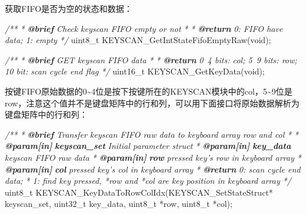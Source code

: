 \documentclass[
  12pt,
]{book}
\newenvironment{Shaded}{\begin{snugshade}}{\end{snugshade}}
\newcommand{\AnnotationTok}[1]{\textcolor[rgb]{0.56,0.35,0.01}{\textbf{\textit{#1}}}}
\newcommand{\CommentTok}[1]{\textcolor[rgb]{0.56,0.35,0.01}{\textit{#1}}}
\newcommand{\CommentVarTok}[1]{\textcolor[rgb]{0.56,0.35,0.01}{\textbf{\textit{#1}}}}
\newcommand{\DataTypeTok}[1]{\textcolor[rgb]{0.13,0.29,0.53}{#1}}
\newcommand{\NormalTok}[1]{#1}
\begin{document}
获取FIFO是否为空的状态和数据：

\begin{Shaded}
\begin{Highlighting}[]
\CommentTok{/**}
\CommentTok{ * }\AnnotationTok{@brief}\CommentTok{ Check keyscan FIFO empty or not}
\CommentTok{ *}
\CommentTok{ * }\AnnotationTok{@return}\CommentTok{ 0: FIFO have data; 1: empty}
\CommentTok{ */}
\DataTypeTok{uint8_t}\NormalTok{ KEYSCAN_GetIntStateFifoEmptyRaw(}\DataTypeTok{void}\NormalTok{);}

\CommentTok{/**}
\CommentTok{ * }\AnnotationTok{@brief}\CommentTok{ GET keyscan FIFO data}
\CommentTok{ *}
\CommentTok{ * }\AnnotationTok{@return}\CommentTok{ 0~4 bits: col; 5~9 bits: row; 10 bit: scan cycle end flag}
\CommentTok{ */}
\DataTypeTok{uint16_t}\NormalTok{ KEYSCAN_GetKeyData(}\DataTypeTok{void}\NormalTok{);}
\end{Highlighting}
\end{Shaded}

按键FIFO原始数据的0\textasciitilde4位是按下按键所在的KEYSCAN模块中的col，5\textasciitilde9位是row，注意这个值并不是键盘矩阵中的行和列，可以用下面接口将原始数据解析为键盘矩阵中的行和列：

\begin{Shaded}
\begin{Highlighting}[]
\CommentTok{/**}
\CommentTok{ * }\AnnotationTok{@brief}\CommentTok{ Transfer keyscan FIFO raw data to keyboard array row and col}
\CommentTok{ *}
\CommentTok{ * }\AnnotationTok{@param[in]}\CommentTok{ }\CommentVarTok{keyscan_set}\CommentTok{       Initial parameter struct}
\CommentTok{ * }\AnnotationTok{@param[in]}\CommentTok{ }\CommentVarTok{key_data}\CommentTok{          keyscan FIFO raw data}
\CommentTok{ * }\AnnotationTok{@param[in]}\CommentTok{ }\CommentVarTok{row}\CommentTok{               pressed key's row in keyboard array}
\CommentTok{ * }\AnnotationTok{@param[in]}\CommentTok{ }\CommentVarTok{col}\CommentTok{               pressed key's col in keyboard array}
\CommentTok{ * }\AnnotationTok{@return}\CommentTok{                      0: scan cycle end data;}
\CommentTok{ *        1: find key pressed, *row and *col are key position in keyboard array}
\CommentTok{ */}
\DataTypeTok{uint8_t}\NormalTok{ KEYSCAN_KeyDataToRowColIdx(KEYSCAN_SetStateStruct* keyscan_set, }\DataTypeTok{uint32_t}\NormalTok{ key_data, }\DataTypeTok{uint8_t}\NormalTok{ *row, }\DataTypeTok{uint8_t}\NormalTok{ *col);}
\end{Highlighting}
\end{Shaded}
\end{document}
